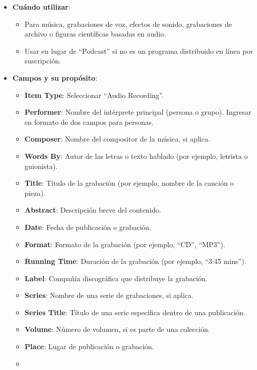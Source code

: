 \documentclass[
  jou,
  floatsintext,
  longtable,
  a4paper,
  nolmodern,
  notxfonts,
  notimes,
  colorlinks=true,linkcolor=blue,citecolor=blue,urlcolor=blue]{apa7}
\providecommand{\tightlist}{%
  \setlength{\itemsep}{0pt}\setlength{\parskip}{0pt}}
\begin{document}
\begin{itemize}
\tightlist
\item
  \textbf{Cuándo utilizar}:

  \begin{itemize}
  \tightlist
  \item
    Para música, grabaciones de voz, efectos de sonido, grabaciones de
    archivo o figuras científicas basadas en audio.
  \item
    Usar en lugar de ``Podcast'' si no es un programa distribuido en
    línea por suscripción.
  \end{itemize}
\item
  \textbf{Campos y su propósito}:

  \begin{itemize}
  \tightlist
  \item
    \textbf{Item Type}: Seleccionar ``Audio Recording''.
  \item
    \textbf{Performer}: Nombre del intérprete principal (persona o
    grupo). Ingresar en formato de dos campos para personas.
  \item
    \textbf{Composer}: Nombre del compositor de la música, si aplica.
  \item
    \textbf{Words By}: Autor de las letras o texto hablado (por ejemplo,
    letrista o guionista).
  \item
    \textbf{Title}: Título de la grabación (por ejemplo, nombre de la
    canción o pieza).
  \item
    \textbf{Abstract}: Descripción breve del contenido.
  \item
    \textbf{Date}: Fecha de publicación o grabación.
  \item
    \textbf{Format}: Formato de la grabación (por ejemplo, ``CD'',
    ``MP3'').
  \item
    \textbf{Running Time}: Duración de la grabación (por ejemplo, ``3:45
    mins'').
  \item
    \textbf{Label}: Compañía discográfica que distribuye la grabación.
  \item
    \textbf{Series}: Nombre de una serie de grabaciones, si aplica.
  \item
    \textbf{Series Title}: Título de una serie específica dentro de una
    publicación.
  \item
    \textbf{Volume}: Número de volumen, si es parte de una colección.
  \item
    \textbf{Place}: Lugar de publicación o grabación.
  \item

\end{itemize}
\end{itemize}
\end{document}
